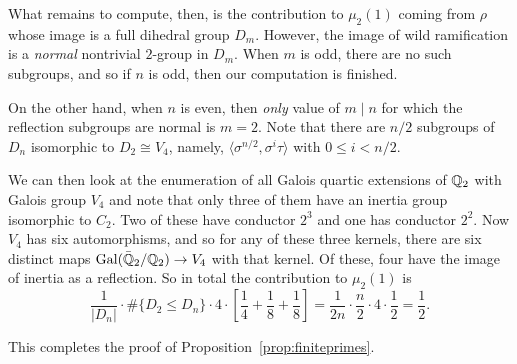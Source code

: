 What remains to compute, then, is the contribution to $\mu_2(1)$ coming from
$\rho$ whose image is a full dihedral group $D_m$. However, the image of wild
ramification is a {\em normal} nontrivial $2$-group in $D_m$. When $m$ is odd,
there are no such subgroups, and so if $n$ is odd, then our computation is
finished.

On the other hand, when $n$ is even, then {\em only} value of $m \mid n$ for
which the reflection subgroups are normal is $m = 2$.  Note that there are
$n/2$ subgroups of $D_n$ isomorphic to $D_2 \cong V_4$, namely, $\langle
\sigma^{n/2}, \sigma^i\tau \rangle$ with $0 \leq i < n/2$.

We can then look at the enumeration of all Galois quartic extensions of $\mathbb{Q}_2$
with Galois group $V_4$ and note that only three of them have an inertia group
isomorphic to $C_2$. Two of these have conductor $2^3$ and one has conductor
$2^2$.  Now $V_4$ has six automorphisms, and so for any of these three kernels,
there are six distinct maps $\operatorname{Gal}(\Bar{\mathbb{Q}}_2/\mathbb{Q}_2) \to V_4$ with that kernel. Of
these, four have the image of inertia as a reflection. So in total the
contribution to $\mu_2(1)$ is
\[ \frac{1}{|D_n|} \cdot \#\{ D_2 \leq D_n \} \cdot 4 \cdot \left[\frac{1}{4} + \frac{1}{8} + \frac{1}{8} \right]
  = \frac{1}{2n} \cdot \frac{n}{2} \cdot 4 \cdot \frac{1}{2}
  = \frac{1}{2}. \]

This completes the proof of Proposition~\ref{prop:finiteprimes}.
